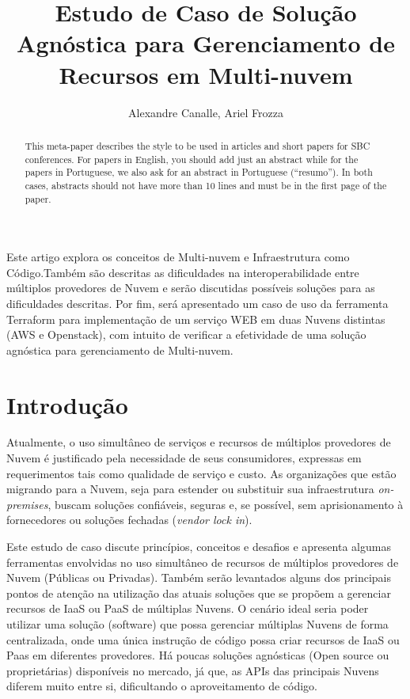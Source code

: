 \documentclass[12pt]{article}
\title{Estudo de Caso de Solução Agnóstica para Gerenciamento de Recursos em Multi-nuvem}
\author{Alexandre Canalle\inst{1}, Ariel Frozza\inst{1}}
\begin{document}
\sloppy
\maketitle
	
\begin{abstract}
	This meta-paper describes the style to be used in articles and short papers
	for SBC conferences. For papers in English, you should add just an abstract
	while for the papers in Portuguese, we also ask for an abstract in
	Portuguese (``resumo''). In both cases, abstracts should not have more than
	10 lines and must be in the first page of the paper.
\end{abstract}

\begin{resumo} 
	Este artigo explora os conceitos de Multi-nuvem e Infraestrutura como Código.Também são descritas as dificuldades na interoperabilidade entre múltiplos provedores de Nuvem e serão discutidas possíveis soluções para as dificuldades descritas. Por fim, será apresentado um caso de uso da ferramenta Terraform para implementação de um serviço WEB em duas Nuvens distintas (AWS e Openstack), com intuito de verificar a efetividade de uma solução agnóstica para gerenciamento de Multi-nuvem.
\end{resumo}

	\section{Introdução}
	    Atualmente, o uso simultâneo de serviços e recursos de múltiplos provedores de Nuvem é justificado pela necessidade de seus consumidores, expressas em requerimentos tais como qualidade de serviço e custo. As organizações que estão migrando para a Nuvem, seja para estender ou substituir sua infraestrutura \textit{on-premises}, buscam soluções confiáveis, seguras e, se possível, sem aprisionamento à fornecedores ou soluções fechadas (\textit{vendor lock in}).
	    
	    Este estudo de caso discute princípios, conceitos e desafios e apresenta algumas ferramentas envolvidas no uso simultâneo de recursos de múltiplos provedores de Nuvem (Públicas ou Privadas). Também serão levantados alguns dos principais pontos de atenção na utilização das atuais soluções que se propõem a gerenciar recursos de IaaS ou PaaS de múltiplas Nuvens. O cenário ideal seria poder utilizar uma solução (software) que possa gerenciar múltiplas Nuvens de forma centralizada, onde uma única instrução de código possa criar recursos de IaaS ou Paas em diferentes provedores. Há poucas soluções agnósticas (Open source ou proprietárias) disponíveis no mercado, já que, as APIs das principais Nuvens diferem muito entre si, dificultando o aproveitamento de código.
	    
\end{document}
